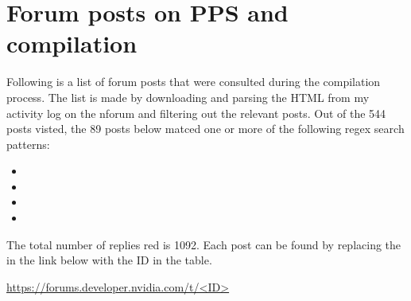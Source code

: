 \section{Forum posts on PPS and compilation}\label{appendix:form_posts}

Following is a list of forum posts that were consulted during the compilation process.
The list is made by downloading and parsing the HTML from my activity log on the \gls{nforum} \cite{martensPostsRedEmil} and filtering out the relevant posts.
Out of the 544 posts visted, the 89 posts below matced one or more of the following regex search patterns:
\begin{itemize}
    \item {}
    \item {}
    \item {}
    \item {}
\end{itemize}
The total number of replies red is 1092.
Each post can be found by replacing the  in the link below with the ID in the table.

\url{https://forums.developer.nvidia.com/t/<ID>}

